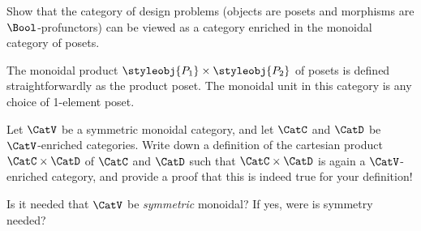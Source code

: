 \begin{gradedexercise}\label{ex:DPIsEnrichedInLat}
Show that the category of design problems (objects are posets and morphisms are $\Bool$-profunctors) can be viewed as a category enriched in the monoidal category of posets.



The monoidal product $\styleobj{P_1} \times \styleobj{P_2}$ of posets is defined straightforwardly as the product poset.
The monoidal unit in this category is any choice of 1-element poset.
\end{gradedexercise}

\begin{gradedexercise}\label{ex:ProductOfEnrichedCats}
Let $\CatV$ be a symmetric monoidal category, and let $\CatC$ and $\CatD$ be $\CatV$-enriched categories. Write down a definition of the cartesian product $\CatC \times \CatD$ of $\CatC$ and $\CatD$ such that $\CatC \times \CatD$ is again a $\CatV$-enriched category, and provide a proof that this is indeed true for your definition!

Is it needed that $\CatV$ be \emph{symmetric} monoidal? If yes, were is symmetry needed?
\end{gradedexercise}

